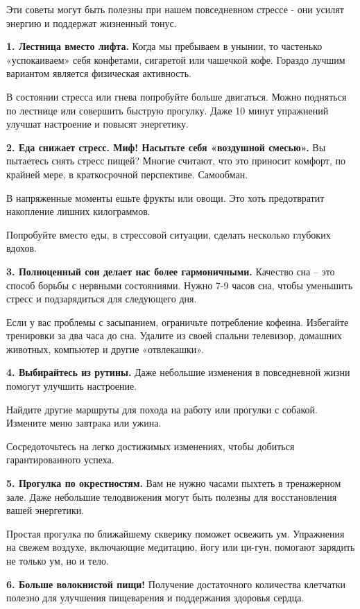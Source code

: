 Эти советы могут быть полезны при нашем повседневном стрессе - они усилят энергию и поддержат жизненный тонус.

\textbf{1. Лестница вместо лифта.}
Когда мы пребываем в унынии, то частенько «успокаиваем» себя конфетами, сигаретой или чашечкой кофе. Гораздо лучшим вариантом является физическая активность.

В состоянии стресса или гнева попробуйте больше двигаться. Можно подняться по лестнице или совершить быструю прогулку. Даже 10 минут упражнений улучшат настроение и повысят энергетику.

\textbf{2. Еда снижает стресс. Миф! Насытьте себя «воздушной смесью».}
Вы пытаетесь снять стресс пищей? Многие считают, что это приносит комфорт, по крайней мере, в краткосрочной перспективе. Самообман.

В напряженные моменты ешьте фрукты или овощи. Это хоть предотвратит накопление лишних килограммов.

Попробуйте вместо еды, в стрессовой ситуации, сделать несколько глубоких вдохов.

\textbf{3. Полноценный сон делает нас более гармоничными.}
Качество сна – это способ борьбы с нервными состояниями. Нужно 7-9 часов сна, чтобы уменьшить стресс и подзарядиться для следующего дня.

Если у вас проблемы с засыпанием, ограничьте потребление кофеина. Избегайте тренировки за два часа до сна. Удалите из своей спальни телевизор, домашних животных, компьютер и другие «отвлекашки».

\textbf{4. Выбирайтесь из рутины.}
Даже небольшие изменения в повседневной жизни помогут улучшить настроение.

Найдите другие маршруты для похода на работу или прогулки с собакой. Измените меню завтрака или ужина.

Сосредоточьтесь на легко достижимых изменениях, чтобы добиться гарантированного успеха.

\textbf{5. Прогулка по окрестностям.}
Вам не нужно часами пыхтеть в тренажерном зале. Даже небольшие телодвижения могут быть полезны для восстановления вашей энергетики.

Простая прогулка по ближайшему скверику поможет освежить ум. Упражнения на свежем воздухе, включающие медитацию, йогу или ци-гун, помогают зарядить не только ум, но и тело.

\textbf{6. Больше волокнистой пищи!}
Получение достаточного количества клетчатки полезно для улучшения пищеварения и поддержания здоровья сердца.

